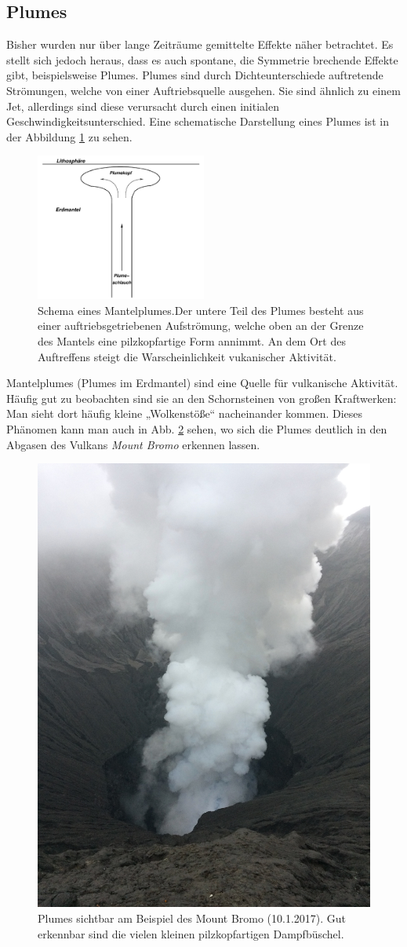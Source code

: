 \documentclass[12pt,a4paper,titlepage,headinclude]{scrartcl}
\numberwithin{equation}{subsection}
\begin{document}
\subsection{Plumes}
Bisher wurden nur über lange Zeiträume gemittelte Effekte näher betrachtet.
Es stellt sich jedoch heraus, dass es auch spontane, die Symmetrie brechende Effekte gibt, beispielsweise Plumes.
Plumes sind durch Dichteunterschiede auftretende Strömungen, welche von einer Auftriebsquelle ausgehen.
Sie sind ähnlich zu einem Jet, allerdings sind diese verursacht durch einen initialen Geschwindigkeitsunterschied.
Eine schematische Darstellung eines Plumes ist in der Abbildung \ref{fig:plume} zu sehen.
\begin{figure}[!ht]
\centering
\includegraphics[width=0.5\textwidth]{Plume.png}
\caption{Schema eines Mantelplumes.\protect\footnotemark Der untere Teil des Plumes besteht aus einer auftriebsgetriebenen Aufströmung, welche oben an der Grenze des Mantels eine pilzkopfartige Form annimmt. An dem Ort des Auftreffens steigt die Warscheinlichkeit vukanischer Aktivität.}
\label{fig:plume}
\end{figure}
Mantelplumes (Plumes im Erdmantel) sind eine Quelle für vulkanische Aktivität.
Häufig gut zu beobachten sind sie an den Schornsteinen von großen Kraftwerken: Man sieht dort häufig kleine „Wolkenstöße“ nacheinander kommen.
Dieses Phänomen kann man auch in Abb. \ref{fig:bromo_plumes} sehen, wo sich die Plumes deutlich in den Abgasen des Vulkans \textit{Mount Bromo} erkennen lassen.
\begin{figure}[!h]
  \centering
  \includegraphics[width=0.4\linewidth]{bromo_plumes}
  \caption{Plumes sichtbar am Beispiel des Mount Bromo (10.1.2017). Gut erkennbar sind die vielen kleinen pilzkopfartigen Dampfbüschel.}
  \label{fig:bromo_plumes}
\end{figure}
\end{document}
